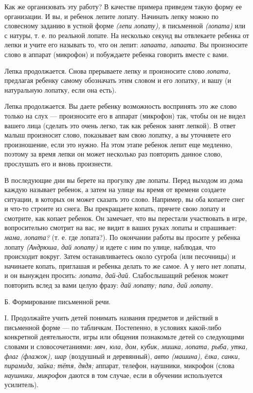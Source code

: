 \documentclass{book}
\renewcommand{\emph}[1]{\textit{#1}}
\begin{document}
Как же организовать эту работу? В качестве примера приведем такую форму
ее организации. И вы, и ребенок лепите лопату. Начинать лепку можно по
словесному заданию в устной форме \emph{(лепи лопату),} в письменной
\emph{(лопата)} или с натуры, т. е. по реальной лопате. На несколько
секунд вы отвлекаете ребенка от лепки и учите его называть то, что он
лепит: \emph{лапаата, лапаата.} Вы произносите слово в аппарат
(микрофон) и побуждаете ребенка говорить вместе с вами.

Лепка продолжается. Снова прерываете лепку и произносите слово
\emph{лопата,} предлагая ребенку самому обозначать этим словом и его
лопатку, и вашу (и натуральную лопатку, если она есть).

Лепка продолжается. Вы даете ребенку возможность воспринять это же слово
только на слух --- произносите его в аппарат (микрофон) так, чтобы он не
видел вашего лица (сделать это очень легко, так как ребенок занят
лепкой). В ответ малыш произносит слово, показывает вам свою лопатку, а
вы уточняете его произношение, если это нужно. На этом этапе ребенок
лепит еще медленно, поэтому за время лепки он может несколько раз
повторить данное слово, прослушать его и вновь произнести.

В последующие дни вы берете на прогулку две лопаты. Перед выходом из
дома каждую называет ребенок, а затем на улице вы время от времени
создаете ситуации, в которых он может сказать это слово. Например, вы
оба копаете снег и что-то строите из снега. Вы прекращаете копать,
прячете свою лопату и смотрите, как копает ребенок. Он замечает, что вы
перестали участвовать в игре, вопросительно смотрит на вас, не видит в
ваших руках лопаты и спрашивает: \emph{мама, лопата?} (т. е. где
лопата?). По окончании работы вы просите у ребенка лопату
\emph{(Андрюша, дай лопату)} и идете с ним по улице, наблюдая, что
происходит вокруг. Затем останавливаетесь около сугроба (или песочницы)
и начинаете копать, приглашая и ребенка делать то же самое. А у него нет
лопаты, и он вынужден просить: \emph{лопата, дай-дай.} Слабослышащий
ребенок может повторить вслед за вами целую фразу: \emph{дай лопату;
папа, дай лопату.}

Б. Формирование письменной речи.

I. Продолжайте учить детей понимать названия предметов и действий в
письменной форме --- по табличкам. Постепенно, в условиях какой-либо
конкретной деятельности, игры или общения познакомьте детей со
следующими словами и словосочетаниями: \emph{мяч, юла, дом, кубик,
мишка, лопата, рыба, утка, флаг (флажок), шар} (воздушный и деревянный),
\emph{авто (машина), ёлка, санки, пирамида, зайка; тётя, дядя;} аппарат,
телефон, наушники, микрофон (слова \emph{наушники, микрофон} даются в
том случае, если в обучении используется усилитель).
\end{document}
